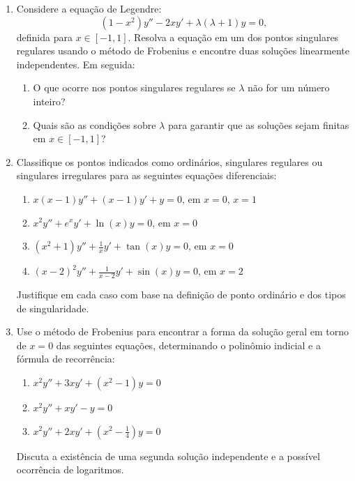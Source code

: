 \begin{enumerate}
	\item Considere a equação de Legendre:
	      \[(1 - x^2)y'' - 2xy' + \lambda(\lambda + 1)y = 0,\]
	      definida para $x \in [-1,1]$. Resolva a equação em um dos pontos singulares regulares usando o método de Frobenius e encontre duas soluções linearmente independentes. Em seguida:
	      \begin{enumerate}
		      \item O que ocorre nos pontos singulares regulares se $\lambda$ não for um número inteiro?
		      \item Quais são as condições sobre $\lambda$ para garantir que as soluções sejam finitas em $x \in [-1,1]$?
	      \end{enumerate}


	\item Classifique os pontos indicados como ordinários, singulares regulares ou singulares irregulares para as seguintes equações diferenciais:
	      \begin{enumerate}
		      \item $x(x-1)y'' + (x-1)y' + y = 0$, em $x = 0$, $x = 1$
		      \item $x^2 y'' + e^x y' + \ln(x) y = 0$, em $x = 0$
		      \item $(x^2 + 1)y'' + \frac{1}{x}y' + \tan(x)y = 0$, em $x = 0$
		      \item $(x-2)^2 y'' + \frac{1}{x-2} y' + \sin(x)y = 0$, em $x = 2$
	      \end{enumerate}
	      Justifique em cada caso com base na definição de ponto ordinário e dos tipos de singularidade.

	\item Use o método de Frobenius para encontrar a forma da solução geral em torno de $x = 0$ das seguintes equações, determinando o polinômio indicial e a fórmula de recorrência:
	      \begin{enumerate}
		      \item $x^2 y'' + 3x y' + (x^2 - 1)y = 0$
		      \item $x^2 y'' + x y' - y = 0$
		      \item $x^2 y'' + 2x y' + \left(x^2 - \frac{1}{4}\right)y = 0$
	      \end{enumerate}
	      Discuta a existência de uma segunda solução independente e a possível ocorrência de logaritmos.
\end{enumerate}

